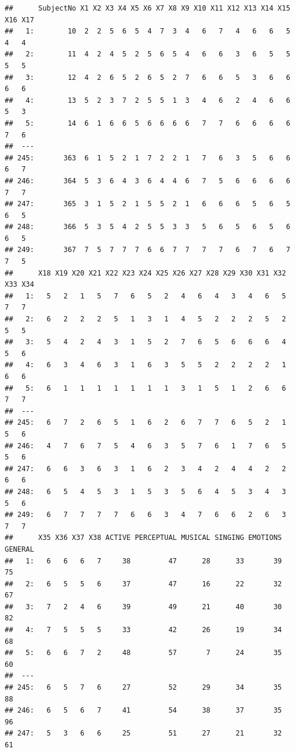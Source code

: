 \documentclass[]{book}
\theoremstyle{definition}
\theoremstyle{definition}
\theoremstyle{definition}
\theoremstyle{remark}
\begin{document}
\begin{verbatim}
##      SubjectNo X1 X2 X3 X4 X5 X6 X7 X8 X9 X10 X11 X12 X13 X14 X15 X16 X17
##   1:        10  2  2  5  6  5  4  7  3  4   6   7   4   6   6   5   4   4
##   2:        11  4  2  4  5  2  5  6  5  4   6   6   3   6   5   5   5   5
##   3:        12  4  2  6  5  2  6  5  2  7   6   6   5   3   6   6   6   6
##   4:        13  5  2  3  7  2  5  5  1  3   4   6   2   4   6   6   5   3
##   5:        14  6  1  6  6  5  6  6  6  6   7   7   6   6   6   6   7   6
##  ---                                                                     
## 245:       363  6  1  5  2  1  7  2  2  1   7   6   3   5   6   6   6   7
## 246:       364  5  3  6  4  3  6  4  4  6   7   5   6   6   6   6   7   7
## 247:       365  3  1  5  2  1  5  5  2  1   6   6   6   5   6   5   6   5
## 248:       366  5  3  5  4  2  5  5  3  3   5   6   5   6   5   6   6   5
## 249:       367  7  5  7  7  7  6  6  7  7   7   7   6   7   6   7   7   5
##      X18 X19 X20 X21 X22 X23 X24 X25 X26 X27 X28 X29 X30 X31 X32 X33 X34
##   1:   5   2   1   5   7   6   5   2   4   6   4   3   4   6   5   7   7
##   2:   6   2   2   2   5   1   3   1   4   5   2   2   2   5   2   5   5
##   3:   5   4   2   4   3   1   5   2   7   6   5   6   6   6   4   5   6
##   4:   6   3   4   6   3   1   6   3   5   5   2   2   2   2   1   6   6
##   5:   6   1   1   1   1   1   1   1   3   1   5   1   2   6   6   7   7
##  ---                                                                    
## 245:   6   7   2   6   5   1   6   2   6   7   7   6   5   2   1   5   6
## 246:   4   7   6   7   5   4   6   3   5   7   6   1   7   6   5   5   6
## 247:   6   6   3   6   3   1   6   2   3   4   2   4   4   2   2   6   6
## 248:   6   5   4   5   3   1   5   3   5   6   4   5   3   4   3   5   6
## 249:   6   7   7   7   7   6   6   3   4   7   6   6   2   6   3   7   7
##      X35 X36 X37 X38 ACTIVE PERCEPTUAL MUSICAL SINGING EMOTIONS GENERAL
##   1:   6   6   6   7     38         47      28      33       39      75
##   2:   6   5   5   6     37         47      16      22       32      67
##   3:   7   2   4   6     39         49      21      40       30      82
##   4:   7   5   5   5     33         42      26      19       34      68
##   5:   6   6   7   2     48         57       7      24       35      60
##  ---                                                                   
## 245:   6   5   7   6     27         52      29      34       35      88
## 246:   6   5   6   7     41         54      38      37       35      96
## 247:   5   3   6   6     25         51      27      21       32      61

\end{verbatim}
\end{document}
